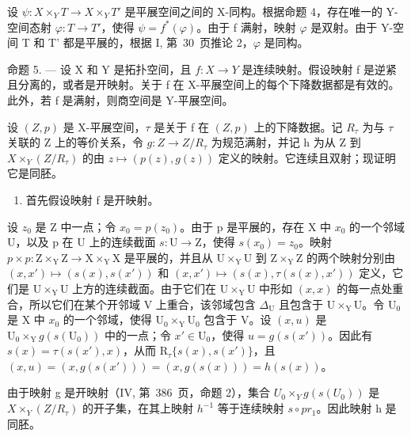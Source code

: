 设 \(\psi\colon X\times_{Y}T\to X\times_{Y}T'\) 是平展空间之间的 X-同构。根据命题 4，存在唯一的 Y-空间态射 \(\varphi\colon T \to T'\)，使得 \(\psi = f^{*}(\varphi)\)。由于 f 满射，映射 \(\varphi\) 是双射。由于 Y-空间 T 和 T' 都是平展的，根据 I, 第~30~页推论 2，\(\varphi\) 是同构。

命题 5. --- 设 X 和 Y 是拓扑空间，且 \(f: X \to Y\) 是连续映射。假设映射 f 是逆紧且分离的，或者是开映射。关于 f 在 X-平展空间上的每个下降数据都是有效的。此外，若 f 是满射，则商空间是 Y-平展空间。

设 \((Z,p)\) 是 X-平展空间，\(\tau\) 是关于 f 在 \((Z,p)\) 上的下降数据。记 \(R_{\tau}\) 为与 \(\tau\) 关联的 Z 上的等价关系，令 \(g: Z \to Z/R_{\tau}\) 为规范满射，并记 h 为从 Z 到 \(X \times_{Y} (Z/R_{\tau})\) 的由 \(z \mapsto (p(z), g(z))\) 定义的映射。它连续且双射；现证明它是同胚。

\begin{enumerate}
\def\labelenumi{\alph{enumi})}
\tightlist
\item
  首先假设映射 f 是开映射。
\end{enumerate}

设 \(z_0\) 是 Z 中一点；令 \(x_0 = p(z_0)\)。由于 p 是平展的，存在 X 中 \(x_0\) 的一个邻域 U，以及 p 在 U 上的连续截面 \(s: \mathrm{U} \to \mathrm{Z}\)，使得 \(s(x_0) = z_0\)。映射 \(p \times p: \mathrm{Z} \times_{\mathrm{Y}} \mathrm{Z} \to \mathrm{X} \times_{\mathrm{Y}} \mathrm{X}\) 是平展的，并且从 \(\mathrm{U} \times_{\mathrm{Y}} \mathrm{U}\) 到 \(\mathrm{Z} \times_{\mathrm{Y}} \mathrm{Z}\) 的两个映射分别由 \((x, x') \mapsto (s(x), s(x'))\) 和 \((x, x') \mapsto (s(x), \tau(s(x), x'))\) 定义，它们是 \(\mathrm{U} \times_{\mathrm{Y}} \mathrm{U}\) 上方的连续截面。由于它们在 \(\mathrm{U} \times_{\mathrm{Y}} \mathrm{U}\) 中形如 \((x, x)\) 的每一点处重合，所以它们在某个开邻域 V 上重合，该邻域包含 \(\Delta_{\mathrm{U}}\) 且包含于 \(\mathrm{U} \times_{\mathrm{Y}} \mathrm{U}\)。令 \(\mathrm{U}_0\) 是 X 中 \(x_0\) 的一个邻域，使得 \(\mathrm{U}_0 \times_{\mathrm{Y}} \mathrm{U}_0\) 包含于 V。设 \((x, u)\) 是 \(\mathrm{U}_0 \times_{\mathrm{Y}} g(s(\mathrm{U}_0))\) 中的一点；令 \(x' \in \mathrm{U}_0\)，使得 \(u = g(s(x'))\)。因此有 \(s(x) = \tau(s(x'), x)\)，从而 \(\mathrm{R}_{\tau}\{s(x), s(x')\}\)，且 \((x, u) = (x, g(s(x'))) = (x, g(s(x))) = h(s(x))\)。

由于映射 g 是开映射（IV, 第~386~页，命题 2），集合 \(U_{0} \times_{Y} g(s(U_{0}))\) 是 \(X \times_{Y}(Z/R_{\tau})\) 的开子集，在其上映射 \(h^{-1}\) 等于连续映射 \(s \circ pr_{1}\)。因此映射 h 是同胚。

